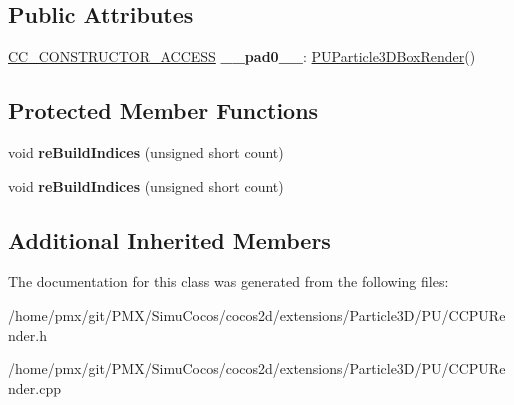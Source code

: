 \subsection*{Public Attributes}
\begin{DoxyCompactItemize}
\item 
\mbox{\label{classPUParticle3DBoxRender_a7eacb31ed2cf049986fc7947b2e7e8a2}} 
\hyperlink{_2cocos2d_2cocos_2base_2ccConfig_8h_a25ef1314f97c35a2ed3d029b0ead6da0}{C\+C\+\_\+\+C\+O\+N\+S\+T\+R\+U\+C\+T\+O\+R\+\_\+\+A\+C\+C\+E\+SS} {\bfseries \+\_\+\+\_\+pad0\+\_\+\+\_\+}\+: \hyperlink{classPUParticle3DBoxRender}{P\+U\+Particle3\+D\+Box\+Render}()
\end{DoxyCompactItemize}
\subsection*{Protected Member Functions}
\begin{DoxyCompactItemize}
\item 
\mbox{\label{classPUParticle3DBoxRender_a5bfeaba2929878075e09ecd8b0422af3}} 
void {\bfseries re\+Build\+Indices} (unsigned short count)
\item 
\mbox{\label{classPUParticle3DBoxRender_a5bfeaba2929878075e09ecd8b0422af3}} 
void {\bfseries re\+Build\+Indices} (unsigned short count)
\end{DoxyCompactItemize}
\subsection*{Additional Inherited Members}


The documentation for this class was generated from the following files\+:\begin{DoxyCompactItemize}
\item 
/home/pmx/git/\+P\+M\+X/\+Simu\+Cocos/cocos2d/extensions/\+Particle3\+D/\+P\+U/C\+C\+P\+U\+Render.\+h\item 
/home/pmx/git/\+P\+M\+X/\+Simu\+Cocos/cocos2d/extensions/\+Particle3\+D/\+P\+U/C\+C\+P\+U\+Render.\+cpp\end{DoxyCompactItemize}
